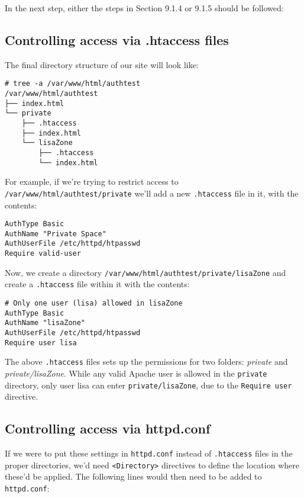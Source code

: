 \noindent
In the next step, either the steps in Section 9.1.4 or 9.1.5 should be followed:

\vspace{-10pt}
\subsection{Controlling access via .htaccess files}
The final directory structure of our site will look like:

\vspace{-15pt}
\begin{verbatim}
# tree -a /var/www/html/authtest
/var/www/html/authtest
├── index.html
└── private
	├── .htaccess
	├── index.html
	└── lisaZone
		├── .htaccess
		└── index.html
\end{verbatim}
\vspace{-10pt}	

\noindent
For example, if we're trying to restrict access to \verb|/var/www/html/authtest/private| we'll add a new \verb|.htaccess| file in it, with the contents: 

\vspace{-15pt}
\begin{verbatim}
AuthType Basic
AuthName "Private Space"
AuthUserFile /etc/httpd/htpasswd        
Require valid-user
\end{verbatim}
\vspace{-10pt}	

\noindent
Now, we create a directory \verb|/var/www/html/authtest/private/lisaZone| and create a \verb|.htaccess| file within it with the contents:

\vspace{-15pt}
\begin{verbatim}
# Only one user (lisa) allowed in lisaZone
AuthType Basic
AuthName "lisaZone"
AuthUserFile /etc/httpd/htpasswd        
Require user lisa
\end{verbatim}
\vspace{-10pt}	

\noindent
The above \verb|.htaccess| files sets up the permissions for two folders: \textit{private} and \textit{private/lisaZone}. While any valid Apache user is allowed in the \verb|private| directory, only user lisa can enter \verb|private/lisaZone|, due to the \verb|Require user| directive. 

\subsection{Controlling access via httpd.conf}
If we were to put these settings in \verb|httpd.conf| instead of \verb|.htaccess| files in the proper directories, we'd need \verb|<Directory>| directives to define the location where these'd be applied. The following lines would then need to be added to \verb|httpd.conf|:

